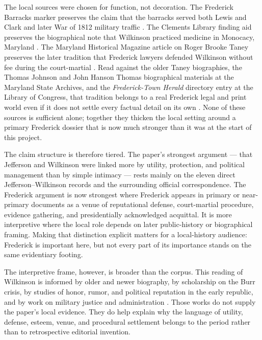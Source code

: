 The local sources were chosen for function, not decoration. The Frederick Barracks marker preserves the claim that the barracks served both Lewis and Clark and later War of 1812 military traffic \citep{frederickbarracks}. The Clements Library finding aid preserves the biographical note that Wilkinson practiced medicine in Monocacy, Maryland \citep{clementsfindingaid}. The Maryland Historical Magazine article on Roger Brooke Taney preserves the later tradition that Frederick lawyers defended Wilkinson without fee during the court-martial \citep{delaplaine1918}. Read against the older Taney biographies, the Thomas Johnson and John Hanson Thomas biographical materials at the Maryland State Archives, and the \textit{Frederick-Town Herald} directory entry at the Library of Congress, that tradition belongs to a real Frederick legal and print world even if it does not settle every factual detail on its own \citep{swisher1935,smith1936,huebner2010,thomasbio,thomasjohnsonbio,fredericktownheraldloc}. None of these sources is sufficient alone; together they thicken the local setting around a primary Frederick dossier that is now much stronger than it was at the start of this project.

The claim structure is therefore tiered. The paper's strongest argument --- that Jefferson and Wilkinson were linked more by utility, protection, and political management than by simple intimacy --- rests mainly on the eleven direct Jefferson--Wilkinson records and the surrounding official correspondence. The Frederick argument is now strongest where Frederick appears in primary or near-primary documents as a venue of reputational defense, court-martial procedure, evidence gathering, and presidentially acknowledged acquittal. It is more interpretive where the local role depends on later public-history or biographical framing. Making that distinction explicit matters for a local-history audience: Frederick is important here, but not every part of its importance stands on the same evidentiary footing.

The interpretive frame, however, is broader than the corpus. This reading of Wilkinson is informed by older and newer biography, by scholarship on the Burr crisis, by studies of honor, rumor, and political reputation in the early republic, and by work on military justice and administration \citep{jacobs1938,linklater2009,cox2023,lewis2017,freeman2002,kierner2024,lurie2001,kohn1975,stagg1983,watson2012}. Those works do not supply the paper's local evidence. They do help explain why the language of utility, defense, esteem, venue, and procedural settlement belongs to the period rather than to retrospective editorial invention.


